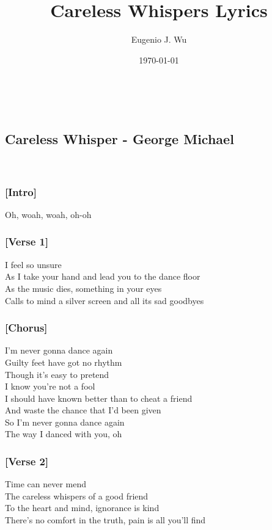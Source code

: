 \documentclass[11pt]{article}
\title{Careless Whispers Lyrics}
\author{Eugenio J. Wu}
\date{\today}
\begin{document}
\maketitle \,

\begin{center}
    \section*{Careless Whisper - George Michael}
\end{center} \,

\subsubsection*{[Intro]}
Oh, woah, woah, oh-oh \\[4pt]

\subsubsection*{[Verse 1]}
I feel so unsure \\[4pt]
As I take your hand and lead you to the dance floor \\[4pt]
As the music dies, something in your eyes \\[4pt]
Calls to mind a silver screen and all its sad goodbyes \\[4pt]

\subsubsection*{[Chorus]}
I'm never gonna dance again \\[4pt]
Guilty feet have got no rhythm \\[4pt]
Though it's easy to pretend \\[4pt]
I know you're not a fool \\[4pt]
I should have known better than to cheat a friend \\[4pt]
And waste the chance that I'd been given \\[4pt]
So I'm never gonna dance again \\[4pt]
The way I danced with you, oh \\[4pt]

\subsubsection*{[Verse 2]}
Time can never mend \\[4pt]
The careless whispers of a good friend \\[4pt]
To the heart and mind, ignorance is kind \\[4pt]
There's no comfort in the truth, pain is all you'll find \\[4pt]
\end{document}
